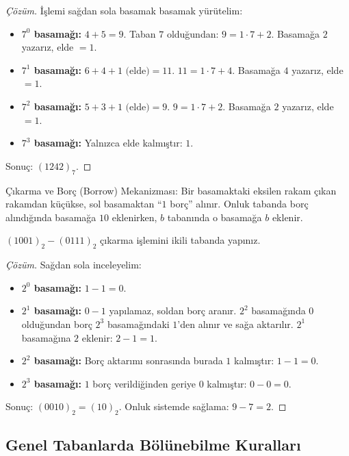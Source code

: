 \begin{proof}[Çözüm]
İşlemi sağdan sola basamak basamak yürütelim:
\begin{itemize}
    \item \textbf{$7^0$ basamağı:} $4 + 5 = 9$. Taban $7$ olduğundan: $9 = 1 \cdot 7 + 2$. Basamağa $2$ yazarız, elde $= 1$.
    \item \textbf{$7^1$ basamağı:} $6 + 4 + 1 \text{ (elde)} = 11$. $11 = 1 \cdot 7 + 4$. Basamağa $4$ yazarız, elde $= 1$.
    \item \textbf{$7^2$ basamağı:} $5 + 3 + 1 \text{ (elde)} = 9$. $9 = 1 \cdot 7 + 2$. Basamağa $2$ yazarız, elde $= 1$.
    \item \textbf{$7^3$ basamağı:} Yalnızca elde kalmıştır: $1$.
\end{itemize}
Sonuç: $(1242)_7$.
\end{proof}

Çıkarma ve Borç (Borrow) Mekanizması:
Bir basamaktaki eksilen rakam çıkan rakamdan küçükse, sol basamaktan ``$1$ borç'' alınır. Onluk tabanda borç alındığında basamağa $10$ eklenirken, $b$ tabanında o basamağa \textbf{$b$} eklenir.

\begin{example}
$(1001)_2 - (0111)_2$ çıkarma işlemini ikili tabanda yapınız.
\end{example}

\begin{proof}[Çözüm]
Sağdan sola inceleyelim:
\begin{itemize}
    \item \textbf{$2^0$ basamağı:} $1 - 1 = 0$.
    \item \textbf{$2^1$ basamağı:} $0 - 1$ yapılamaz, soldan borç aranır. $2^2$ basamağında $0$ olduğundan borç $2^3$ basamağındaki $1$'den alınır ve sağa aktarılır. $2^1$ basamağına $2$ eklenir: $2 - 1 = 1$.
    \item \textbf{$2^2$ basamağı:} Borç aktarımı sonrasında burada $1$ kalmıştır: $1 - 1 = 0$.
    \item \textbf{$2^3$ basamağı:} $1$ borç verildiğinden geriye $0$ kalmıştır: $0 - 0 = 0$.
\end{itemize}
Sonuç: $(0010)_2 = (10)_2$.
Onluk sistemde sağlama: $9 - 7 = 2$.
\end{proof}

\subsection{Genel Tabanlarda Bölünebilme Kuralları}

